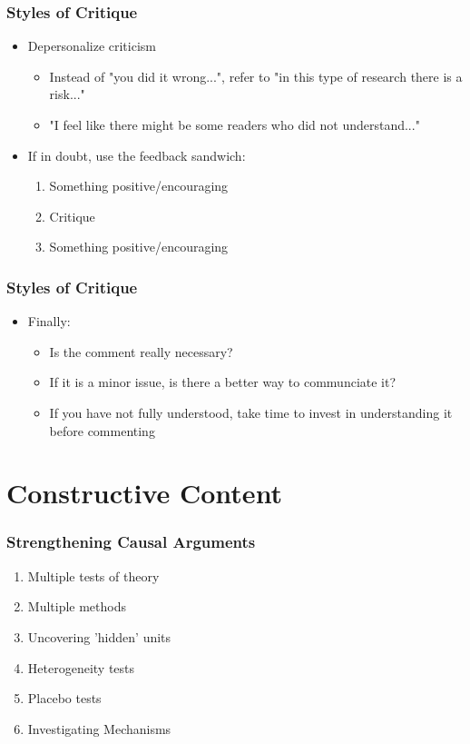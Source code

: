 \documentclass[xcolor=x11names,compress]{beamer}\usepackage[]{graphicx}\usepackage[]{color}
\renewcommand{\(}{\begin{columns}}
\renewcommand{\)}{\end{columns}}
\newcommand{\<}[1]{\begin{column}{#1}}
\renewcommand{\>}{\end{column}}
\begin{document}
\begin{frame}
\frametitle{Styles of Critique}
\begin{itemize}
\item Depersonalize criticism
\pause
\begin{itemize}
\item Instead of "you did it wrong...", refer to "in this type of research there is a risk..."
\pause
\item "I feel like there might be some readers who did not understand..."
\pause
\end{itemize}
\item If in doubt, use the feedback sandwich:
\pause
\begin{enumerate}
\item Something positive/encouraging
\item Critique
\item Something positive/encouraging
\end{enumerate}
\end{itemize}
\end{frame}

\begin{frame}
\frametitle{Styles of Critique}
\begin{itemize}
\item Finally:
\pause
\begin{itemize}
\item Is the comment really necessary?
\pause
\item If it is a minor issue, is there a better way to communciate it?
\pause
\item If you have not fully understood, take time to invest in understanding it before commenting
\end{itemize}
\end{itemize}
\end{frame}

\section{Constructive Content}

\begin{frame}
\frametitle{Strengthening Causal Arguments}
\begin{enumerate}
\item Multiple tests of theory
\pause
\item Multiple methods
\pause
\item Uncovering 'hidden' units
\pause
\item Heterogeneity tests
\pause
\item Placebo tests
\pause
\item Investigating Mechanisms
\end{enumerate}
\end{frame}
\end{document}
